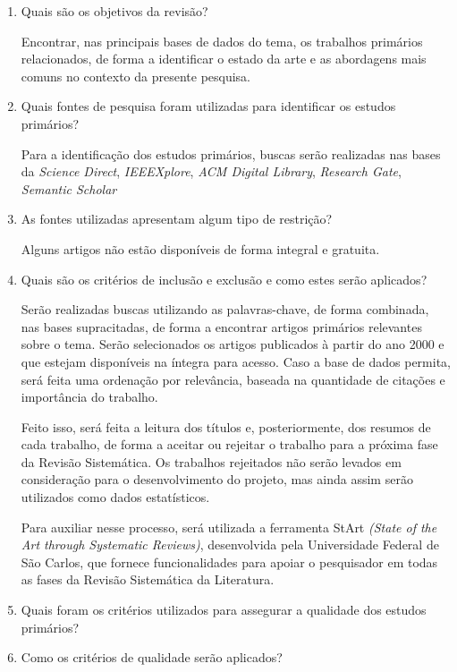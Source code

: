 \documentclass[a4paper,11pt]{article}
\begin{document}
\begin{enumerate}
\item{Quais são os objetivos da revisão?}

Encontrar, nas principais bases de dados do tema, os trabalhos primários relacionados, de forma a identificar o estado da arte e as abordagens mais comuns no contexto da presente pesquisa.

\item{Quais fontes de pesquisa foram utilizadas para identificar os estudos primários?}

Para a identificação dos estudos primários, buscas serão realizadas nas bases da \emph{Science Direct}, \emph{IEEEXplore}, \emph{ACM Digital Library}, \emph{Research Gate}, \emph{Semantic Scholar}

\item{As fontes utilizadas apresentam algum tipo de restrição?}

Alguns artigos não estão disponíveis de forma integral e gratuita. 
\item{Quais são os critérios de inclusão e exclusão e como estes serão aplicados?}

Serão realizadas buscas utilizando as palavras-chave, de forma combinada, nas bases supracitadas, de forma a encontrar artigos primários relevantes sobre o tema. Serão selecionados os artigos publicados à partir do ano 2000 e que estejam disponíveis na íntegra para acesso. Caso a base de dados permita, será feita uma ordenação por relevância, baseada na quantidade de citações e importância do trabalho.

Feito isso, será feita a leitura dos títulos e, posteriormente, dos resumos de cada trabalho, de forma a aceitar ou rejeitar o trabalho para a próxima fase da Revisão Sistemática. Os trabalhos rejeitados não serão levados em consideração para o desenvolvimento do projeto, mas ainda assim serão utilizados como dados estatísticos.

Para auxiliar nesse processo, será utilizada a ferramenta StArt  \emph{(State of the Art through Systematic Reviews)}, desenvolvida pela Universidade Federal de São Carlos, que fornece funcionalidades para apoiar o pesquisador em todas as fases da Revisão Sistemática da Literatura.

\item{Quais foram os critérios utilizados para assegurar a qualidade dos estudos primários?}

\item{Como os critérios de qualidade serão aplicados?}




\end{enumerate}
\end{document}
